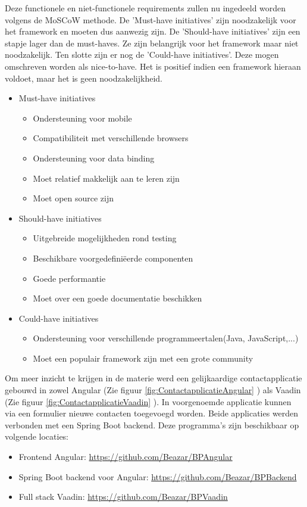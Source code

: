 Deze functionele en niet-functionele requirements zullen nu ingedeeld worden volgens de MoSCoW methode.\autocite{ProductPlan2019}
De 'Must-have initiatives' zijn noodzakelijk voor het framework en moeten dus aanwezig zijn.
De 'Should-have initiatives' zijn een stapje lager dan de must-haves. Ze zijn belangrijk voor het framework maar niet noodzakelijk.
Ten slotte zijn er nog de 'Could-have initiatives'. Deze mogen omschreven worden als nice-to-have. Het is positief indien een framework hieraan voldoet, maar het is geen noodzakelijkheid.

\begin{itemize}
	\item  Must-have initiatives
	\begin{itemize}
	\item Ondersteuning voor mobile
	\item Compatibiliteit met verschillende browsers
	\item Ondersteuning voor data binding
	\item Moet relatief makkelijk aan te leren zijn
	\item Moet open source zijn	 
	\end{itemize}
	\item Should-have initiatives
	\begin{itemize}
	\item Uitgebreide mogelijkheden rond testing
	\item Beschikbare voorgedefiniëerde componenten 
	\item Goede performantie
	\item Moet over een goede documentatie beschikken
	\end{itemize}
		\item Could-have initiatives
		\begin{itemize}
	\item Ondersteuning voor verschillende programmeertalen(Java, JavaScript,...)
	\item Moet een populair framework zijn met een grote community
		\end{itemize}
\end{itemize}

Om meer inzicht te krijgen in de materie werd een gelijkaardige contactapplicatie gebouwd in zowel Angular (Zie figuur \ref{fig:ContactapplicatieAngular} ) als Vaadin (Zie figuur \ref{fig:ContactapplicatieVaadin} ). In voorgenoemde applicatie kunnen via een formulier nieuwe contacten toegevoegd worden. Beide applicaties werden verbonden met een Spring Boot backend. Deze programma's zijn beschikbaar op volgende locaties:
\begin{itemize}
	\item Frontend Angular: \url{https://github.com/Beazar/BPAngular}
	\item Spring Boot backend voor Angular: \url{https://github.com/Beazar/BPBackend}
	\item Full stack Vaadin: \url{https://github.com/Beazar/BPVaadin}
\end{itemize}

